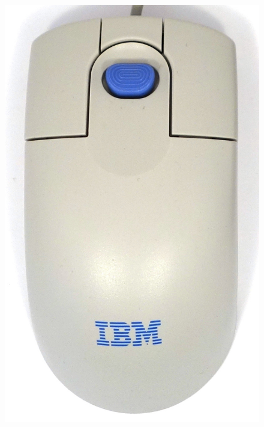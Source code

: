 \documentclass[11pt, a4paper]{article}
\begin{document}
\begin{figure}[h]
    \centering
    \includegraphics[scale=0.7]{2000_ibm_scrollpoint_ii_mouse/top_30.jpg}

\end{figure}
\end{document}
